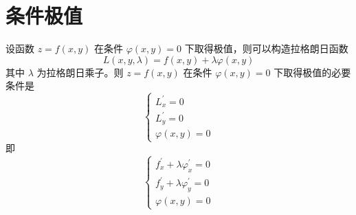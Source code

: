 \section{条件极值}

\begin{theorem}[拉格朗日乘数法]
    设函数 $z=f(x,y)$ 在条件 $\varphi(x,y)=0$ 下取得极值，则可以构造拉格朗日函数
    \begin{equation}
        L(x,y,\lambda)=f(x,y)+\lambda\varphi(x,y)
    \end{equation}
    其中 $\lambda$ 为拉格朗日乘子。则 $z=f(x,y)$ 在条件 $\varphi(x,y)=0$ 下取得极值的必要条件是
    \begin{equation}
        \begin{cases}
            L^{\prime}_x=0 \\
            L^{\prime}_y=0 \\
            \varphi(x,y)=0
        \end{cases}
    \end{equation}
    即
    \begin{equation}
        \begin{cases}
            f^{\prime}_x+\lambda\varphi^{\prime}_x=0 \\
            f^{\prime}_y+\lambda\varphi^{\prime}_y=0 \\
            \varphi(x,y)=0
        \end{cases}
    \end{equation}
\end{theorem}
